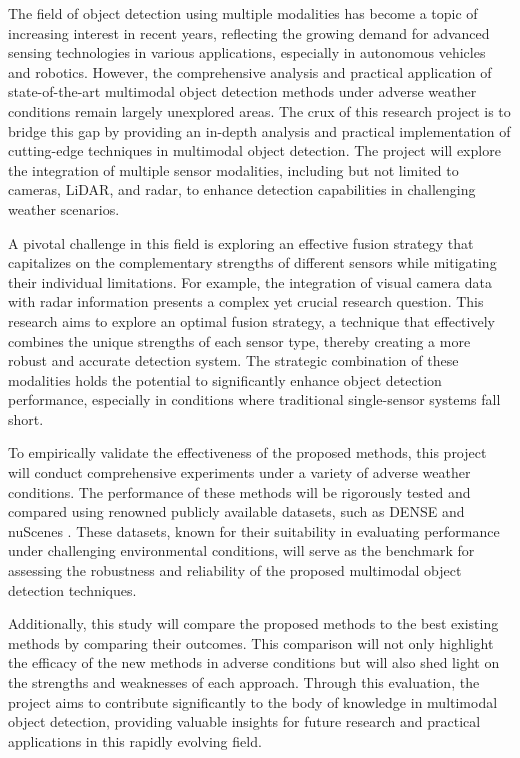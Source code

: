 \documentclass[report.tex]{subfiles}
\begin{document}

    The field of object detection using multiple modalities has become a topic of increasing interest in recent years, reflecting the growing demand for advanced sensing technologies in various applications, especially in autonomous vehicles and robotics. However, the comprehensive analysis and practical application of state-of-the-art multimodal object detection methods under adverse weather conditions remain largely unexplored areas. The crux of this research project is to bridge this gap by providing an in-depth analysis and practical implementation of cutting-edge techniques in multimodal object detection. The project will explore the integration of multiple sensor modalities, including but not limited to cameras, LiDAR, and radar, to enhance detection capabilities in challenging weather scenarios.

    A pivotal challenge in this field is exploring an effective fusion strategy that capitalizes on the complementary strengths of different sensors while mitigating their individual limitations. For example, the integration of visual camera data with radar information presents a complex yet crucial research question. This research aims to explore an optimal fusion strategy, a technique that effectively combines the unique strengths of each sensor type, thereby creating a more robust and accurate detection system. The strategic combination of these modalities holds the potential to significantly enhance object detection performance, especially in conditions where traditional single-sensor systems fall short.

    To empirically validate the effectiveness of the proposed methods, this project will conduct comprehensive experiments under a variety of adverse weather conditions. The performance of these methods will be rigorously tested and compared using renowned publicly available datasets, such as DENSE \cite{bijelic2020seeing} and nuScenes \cite{caesar2020nuscenes}. These datasets, known for their suitability in evaluating performance under challenging environmental conditions, will serve as the benchmark for assessing the robustness and reliability of the proposed multimodal object detection techniques.

    Additionally, this study will compare the proposed methods to the best existing methods by comparing their outcomes. This comparison will not only highlight the efficacy of the new methods in adverse conditions but will also shed light on the strengths and weaknesses of each approach. Through this evaluation, the project aims to contribute significantly to the body of knowledge in multimodal object detection, providing valuable insights for future research and practical applications in this rapidly evolving field.





\end{document}
